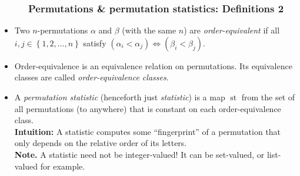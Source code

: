 \documentclass{beamer}
\newcommand{\st}{\operatorname{st}}
\newcommand{\fti}[1]{\frametitle{\ \ \ \ \ #1}}
\newcommand{\set}[1]{\left\{ #1 \right\}}
\newcommand{\tup}[1]{\left( #1 \right)}
\newcommand{\defn}[1]{{\color{darkred}\emph{#1}}} %
\theoremstyle{plain}
\begin{document}
\begin{frame}
\fti{Permutations \& permutation statistics: Definitions 2}

\begin{itemize}

\item Two $n$-permutations $\alpha$ and $\beta$ (with the same $n$)
      are \defn{order-equivalent} if all $i, j \in \set{1, 2, \ldots, n}$
      satisfy $\tup{\alpha_i < \alpha_j} \Longleftrightarrow
      \tup{\beta_i < \beta_j}$.

\item Order-equivalence is an equivalence relation on permutations.
      Its equivalence classes are called \defn{order-equivalence
      classes}.

\pause

\item A \defn{permutation statistic} (henceforth just \defn{statistic})
      is a map $\st$ from the set
      of all permutations (to anywhere) that is constant on each
      order-equivalence class. \\
      \textbf{Intuition:} A statistic computes some ``fingerprint''
      of a permutation that only depends on the relative order of its
      letters. \pause \\
      \textbf{Note.} A statistic need not be integer-valued!
      It can be set-valued, or list-valued for example.

\end{itemize}
\end{frame}
\end{document}
